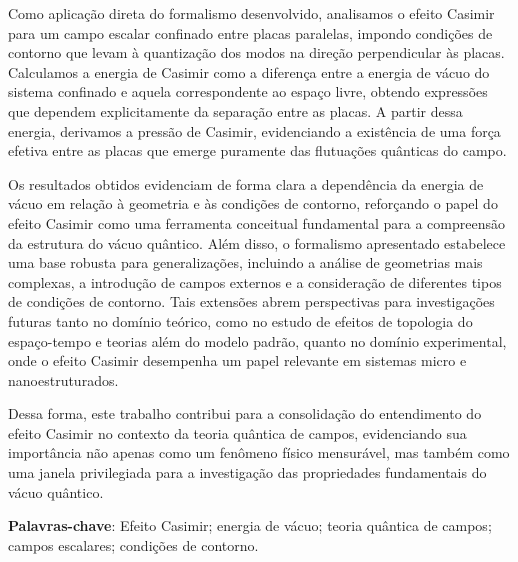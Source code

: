 Como aplicação direta do formalismo desenvolvido, analisamos o efeito Casimir para um campo escalar confinado entre placas paralelas, impondo condições de contorno que levam à quantização dos modos na direção perpendicular às placas. Calculamos a energia de Casimir como a diferença entre a energia de vácuo do sistema confinado e aquela correspondente ao espaço livre, obtendo expressões que dependem explicitamente da separação entre as placas. A partir dessa energia, derivamos a pressão de Casimir, evidenciando a existência de uma força efetiva entre as placas que emerge puramente das flutuações quânticas do campo.

Os resultados obtidos evidenciam de forma clara a dependência da energia de vácuo em relação à geometria e às condições de contorno, reforçando o papel do efeito Casimir como uma ferramenta conceitual fundamental para a compreensão da estrutura do vácuo quântico. Além disso, o formalismo apresentado estabelece uma base robusta para generalizações, incluindo a análise de geometrias mais complexas, a introdução de campos externos e a consideração de diferentes tipos de condições de contorno. Tais extensões abrem perspectivas para investigações futuras tanto no domínio teórico, como no estudo de efeitos de topologia do espaço-tempo e teorias além do modelo padrão, quanto no domínio experimental, onde o efeito Casimir desempenha um papel relevante em sistemas micro e nanoestruturados.

Dessa forma, este trabalho contribui para a consolidação do entendimento do efeito Casimir no contexto da teoria quântica de campos, evidenciando sua importância não apenas como um fenômeno físico mensurável, mas também como uma janela privilegiada para a investigação das propriedades fundamentais do vácuo quântico.
\vspace*{2em}

\textbf{Palavras-chave}: Efeito Casimir; energia de vácuo; teoria quântica de campos; campos escalares; condições de contorno.